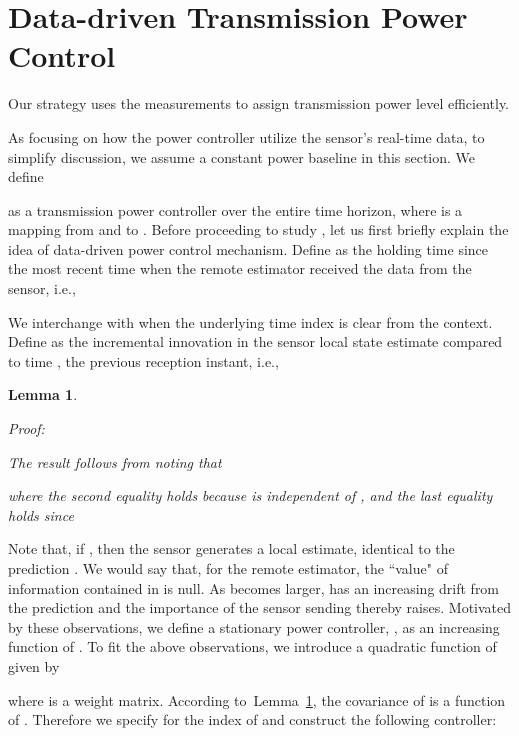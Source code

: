 \documentclass[twocolumn]{autart}    \usepackage{cite}
\newtheorem{lemma}[theorem]{Lemma}
\begin{document}
{\section{Data-driven Transmission Power Control}\label{sec:transmission-power-control}
Our strategy uses
the measurements  to assign
transmission power level efficiently.
{As focusing on how the power controller utilize the
sensor's real-time data,
to simplify discussion, we assume a constant power
baseline  in this section.
We define

as a transmission power controller over the entire time horizon, where
 is a mapping from  and  to .
Before proceeding to study , let us first briefly explain the idea of data-driven power control mechanism.
Define  as the holding time since
the most recent time when the remote estimator received the data from the sensor, i.e.,

We interchange  with  when the underlying time index is clear from the context.
Define  as the incremental innovation in the sensor local state estimate compared to time , the previous reception instant, i.e.,

\begin{lemma} \label{lemma:z_k}

\begin{pf*}{Proof:}
{
The result follows from noting that

where the second equality holds because  is independent of , and
the last equality holds since 
}
\end{pf*}
\end{lemma}
Note that, if , then the sensor generates a local estimate,
 identical to the prediction . We would say that, for the remote estimator, the
 ``value" of information contained in  is null.
As  becomes larger,
 has an increasing drift
from the prediction  and the importance of the sensor sending  thereby
raises. Motivated by these observations, we define a stationary power controller, ,
as an increasing function
of . To fit the above observations, we introduce a quadratic function of  given by

where  is a weight matrix.
According to~Lemma~\ref{lemma:z_k},
the covariance of  is a function of .
Therefore we specify  for the index
of 
and construct the following controller:

}}
\end{document}
